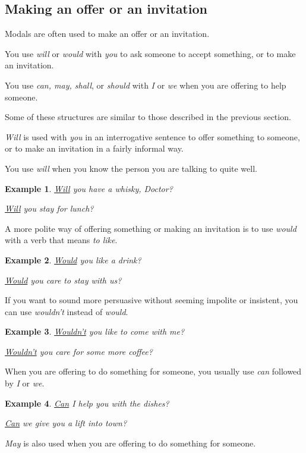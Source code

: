 \documentclass[oneside]{book}
\numberwithin{equation}{section}
\newtheorem{example}{Example}[section]
\begin{document}
\subsection{Making an offer or an invitation}
\noindent{} Modals are often used to make an offer or an invitation.

%
You use \textit{will} or \textit{would} with \textit{you} to ask someone to accept something, or to make an invitation.

%
You use \textit{can, may, shall}, or \textit{should} with \textit{I} or \textit{we} when you are offering to help someone.

%
Some of these structures are similar to those described in the previous section.

%
\noindent{} \textit{Will} is used with \textit{you} in an interrogative sentence to offer something to someone, or to make an invitation in a fairly informal way.

You use \textit{will} when you know the person you are talking to quite well.
\begin{example}
    \underline{Will} you have a whisky, Doctor?
    
    \underline{Will} you stay for lunch?
\end{example}
%
\noindent{} A more polite way of offering something or making an invitation is to use \textit{would} with a verb that means \textit{to like}.
\begin{example}
    \underline{Would} you like a drink?
    
    \underline{Would} you care to stay with us?
\end{example}
If you want to sound more persuasive without seeming impolite or insistent, you can use \textit{wouldn't} instead of \textit{would}.
\begin{example}
    \underline{Wouldn't} you like to come with me?
    
    \underline{Wouldn't} you care for some more coffee?
\end{example}
%
\noindent{} When you are offering to do something for someone, you usually use \textit{can} followed by \textit{I} or \textit{we}.
\begin{example}
    \underline{Can} I help you with the dishes?
    
    \underline{Can} we give you a lift into town?
\end{example}
%
\noindent{} \textit{May} is also used when you are offering to do something for someone.
\end{document}
